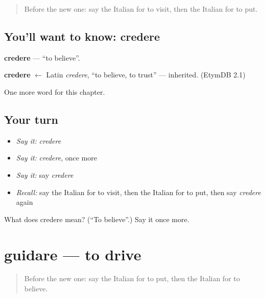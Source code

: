 \label{lesson:IT-C133-credere}



\begin{quote}
Before the new one: say the Italian for to visit, then the Italian for to put.
\end{quote}

\subsection*{You'll want to know: credere}
\textbf{credere} — \textquotedblleft{}to believe\textquotedblright{}.

\begin{cousinweb}
\textbf{credere} $\leftarrow$ Latin \emph{credere}, \textquotedblleft{}to believe, to trust\textquotedblright{} — inherited. (EtymDB 2.1)
\end{cousinweb}

\begin{grammarlens}[title={What you've built}]
One more word for this chapter.
\end{grammarlens}

\subsection*{Your turn}
\begin{itemize}
\raggedright
  \item \emph{Say it:} \emph{credere}
  \item \emph{Say it:} \emph{credere}, once more
  \item \emph{Say it:} say \emph{credere}
  \item \emph{Recall:} say the Italian for to visit, then the Italian for to put, then say \emph{credere} again
\end{itemize}

\begin{tcolorbox}[breakable,colback=teal!4,colframe=teal!35!black,title={Before you move on}]
What does credere mean? (\textquotedblleft{}To believe\textquotedblright{}.) Say it once more.
\end{tcolorbox}
\section[guidare]{guidare — to drive}

\label{lesson:IT-C133-guidare}



\begin{quote}
Before the new one: say the Italian for to put, then the Italian for to believe.
\end{quote}


